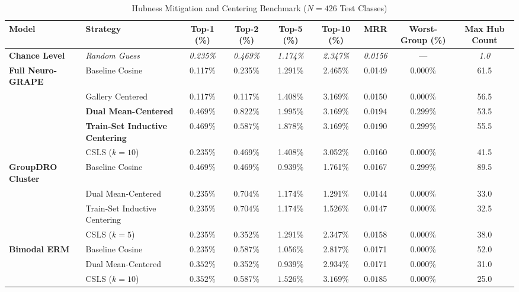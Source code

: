 \documentclass[conference]{IEEEtran}
\begin{document}
\begin{table}[t]
\centering
\caption{Hubness Mitigation and Centering Benchmark ($N = 426$ Test Classes)}
\label{tab:centering}
\begin{tabular}{llccccccc}
\toprule
\textbf{Model} & \textbf{Strategy} & \textbf{Top-1 (\%)} & \textbf{Top-2 (\%)} & \textbf{Top-5 (\%)} & \textbf{Top-10 (\%)} & \textbf{MRR} & \textbf{Worst-Group (\%)} & \textbf{Max Hub Count} \\
\midrule
\textbf{Chance Level} & \emph{Random Guess} & \emph{0.235\%} & \emph{0.469\%} & \emph{1.174\%} & \emph{2.347\%} & \emph{0.0156} & --- & \emph{1.0} \\
\midrule
\textbf{Full Neuro-GRAPE} & Baseline Cosine & 0.117\% & 0.235\% & 1.291\% & 2.465\% & 0.0149 & 0.000\% & 61.5 \\
& Gallery Centered & 0.117\% & 0.117\% & 1.408\% & 3.169\% & 0.0150 & 0.000\% & 56.5 \\
& \textbf{Dual Mean-Centered} & $\mathbf{0.469\%}$ & $\mathbf{0.822\%}$ & $\mathbf{1.995\%}$ & $\mathbf{3.169\%}$ & $\mathbf{0.0194}$ & $\mathbf{0.299\%}$ & 53.5 \\
& \textbf{Train-Set Inductive Centering} & $\mathbf{0.469\%}$ & $\mathbf{0.587\%}$ & $\mathbf{1.878\%}$ & $\mathbf{3.169\%}$ & $\mathbf{0.0190}$ & $\mathbf{0.299\%}$ & 55.5 \\
& CSLS ($k=10$) & 0.235\% & 0.469\% & 1.408\% & 3.052\% & 0.0160 & 0.000\% & 41.5 \\
\midrule
\textbf{GroupDRO Cluster} & Baseline Cosine & $\mathbf{0.469\%}$ & 0.469\% & 0.939\% & 1.761\% & 0.0167 & 0.299\% & 89.5 \\
& Dual Mean-Centered & 0.235\% & $\mathbf{0.704\%}$ & 1.174\% & 1.291\% & 0.0144 & 0.000\% & 33.0 \\
& Train-Set Inductive Centering & 0.235\% & $\mathbf{0.704\%}$ & 1.174\% & 1.526\% & 0.0147 & 0.000\% & 32.5 \\
& CSLS ($k=5$) & 0.235\% & 0.352\% & 1.291\% & 2.347\% & 0.0158 & 0.000\% & 38.0 \\
\midrule
\textbf{Bimodal ERM} & Baseline Cosine & 0.235\% & 0.587\% & 1.056\% & 2.817\% & 0.0171 & 0.000\% & 52.0 \\
& Dual Mean-Centered & $\mathbf{0.352\%}$ & 0.352\% & 0.939\% & 2.934\% & 0.0171 & 0.000\% & 31.0 \\
& CSLS ($k=10$) & $\mathbf{0.352\%}$ & 0.587\% & $\mathbf{1.526\%}$ & $\mathbf{3.169\%}$ & $\mathbf{0.0185}$ & 0.000\% & 25.0 \\
\bottomrule
\end{tabular}
\end{table}
\end{document}
